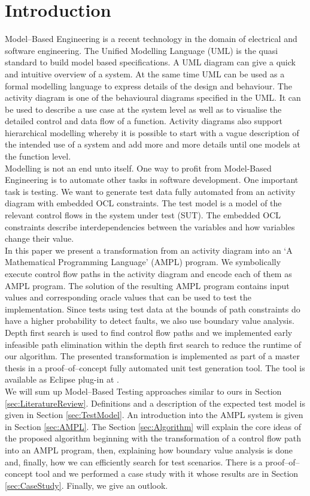 \documentclass[runningheads,a4paper]{llncs}%
\begin{document}
\section{Introduction}%
Model--Based Engineering is a recent technology in the domain of electrical and software engineering. 
The Unified Modelling Language\textsuperscript{\texttrademark} (UML) is the quasi standard to build model based specifications. A UML diagram can give a quick and intuitive overview of a system. At the same time UML can be used as a formal modelling language to express details of the design and behaviour. The activity diagram is one of the behavioural diagrams specified in the UML. It can be used to describe a use case at the system level as well as to visualise the detailed control and data flow of a function. Activity diagrams also support hierarchical modelling whereby it is possible to start with a vague description of the intended use of a system and add more and more details until one models at the function level.\\%
Modelling is not an end unto itself. One way to profit from Model-Based Engineering is to automate other tasks in software development. One important task is testing. We want to generate test data fully automated from an activity diagram with embedded OCL constraints. The test model is a model of the relevant control flows in the system under test (SUT). The embedded OCL constraints describe interdependencies between the variables and how variables change their value.\\
In this paper we present a transformation from an activity diagram into an `A Mathematical Programming Language' (AMPL) program. We symbolically execute control flow paths in the activity diagram and encode each of them as AMPL program. The solution of the resulting AMPL program contains input values and corresponding oracle values that can be used to test the implementation. Since tests using test data at the bounds of path constraints do have a higher probability to detect faults, we also use boundary value analysis. Depth first search is used to find control flow paths and we implemented early infeasible path elimination within the depth first search to reduce the runtime of our algorithm. The presented transformation is implemented as part of a master thesis \cite{Kurth2014AutomatedGen} in a proof--of--concept fully automated unit test generation tool. The tool is available as Eclipse plug-in at \cite{PartegWebsite}.\\%
We will sum up Model--Based Testing approaches similar to ours in Section \ref{sec:LiteratureReview}. Definitions and a description of the expected test model is given in Section \ref{sec:TestModel}. 
An introduction into the AMPL system is given in Section \ref{sec:AMPL}. 
The Section \ref{sec:Algorithm} will explain the core ideas of the proposed algorithm beginning with the transformation of a control flow path into an AMPL program, then, explaining how boundary value analysis is done and, finally, how we can efficiently search for test scenarios. There is a proof--of--concept tool and we performed a case study with it whose results are in Section \ref{sec:CaseStudy}. Finally, we give an outlook.%
\end{document}
